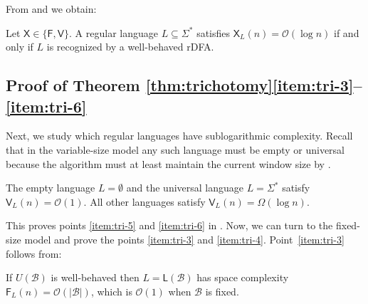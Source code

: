 \documentclass{theoretics}
\newcommand{\B}{\mathcal{B}}
\renewcommand{\O}{\mathcal{O}}
\newcommand{\F}{\mathsf{F}}
\renewcommand{\L}{\mathsf{L}}
\newcommand{\V}{\mathsf{V}}
\newcommand{\X}{\mathsf{X}}
\begin{document}
From  and  we obtain:
\begin{corollary}
	\label{cor:log-wb}
	Let $\X \in \{ \F,\V\}$.
	A regular language $L \subseteq \Sigma^*$ satisfies $\X_L(n) = \O(\log n)$
	if and only if $L$ is recognized by a well-behaved rDFA.
\end{corollary}


\subsection{Proof of Theorem \ref{thm:trichotomy}\ref{item:tri-3}--\ref{item:tri-6}}

\label{subsec:const}

Next, we study which regular languages have sublogarithmic complexity.
Recall that in the variable-size model any such language must be empty or universal
because the algorithm must at least 
maintain the current window size by .

\begin{corollary}
	\label{cor:v-triv}
	The empty language $L = \emptyset$ and the universal language $L = \Sigma^*$ satisfy $\V_L(n) = \O(1)$.
	All other languages satisfy $\V_L(n) = \Omega(\log n)$.
\end{corollary}

This proves points \ref{item:tri-5} and \ref{item:tri-6}
in .
Now, we can turn to the fixed-size model
and prove the points \ref{item:tri-3} and \ref{item:tri-4}. Point~\ref{item:tri-3} follows from:

\begin{proposition}
	\label{prop:r-wb}
	If $U(\B)$ is well-behaved then $L = \L(\B)$ has space complexity $\F_L(n) = \O(|\B|)$,
	which is $\O(1)$ when $\B$ is fixed.
\end{proposition}
\end{document}
